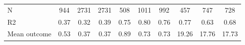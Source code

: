 \begin{tabular}{lccc|ccc|ccc}
N           &         944         &        2731         &        2731         &         508         &        1011         &         992         &         457         &         747         &         728         \\
R2          &        0.37         &        0.32         &        0.39         &        0.75         &        0.80         &        0.76         &        0.77         &        0.63         &        0.68         \\
Mean outcome&        0.53         &        0.37         &        0.37         &        0.89         &        0.73         &        0.73         &       19.26         &       17.76         &       17.73         \\
\bottomrule \end{tabular}
